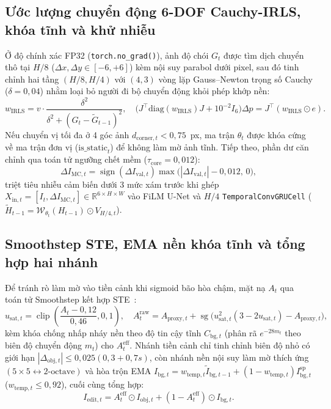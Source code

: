 \documentclass[journal]{IEEEtran}
\DeclareMathOperator{\clip}{clip}
\DeclareMathOperator{\sg}{sg}
\DeclareMathOperator{\sign}{sign}
\begin{document}
\subsection{Ước lượng chuyển động 6-DOF Cauchy-IRLS, khóa tĩnh và khử nhiễu}
Ở độ chính xác FP32 (\texttt{torch.no\_grad()}), ảnh độ chói $G_t$ được tìm dịch chuyển thô tại $H/8$ ($\Delta x, \Delta y \in [-6,+6]$) kèm nội suy parabol dưới pixel, sau đó tinh chỉnh hai tầng $(H/8, H/4)$ với $(4,3)$ vòng lặp Gauss--Newton trọng số Cauchy ($\delta = 0{,}04$) nhằm loại bỏ người đi bộ chuyển động khỏi phép khớp nền:
\begin{equation}
    w_{\mathrm{IRLS}} = v \cdot \frac{\delta^2}{\delta^2 + (G_t - \tilde{G}_{t-1})^2}, \quad \big(J^\top \mathrm{diag}(w_{\mathrm{IRLS}}) J + 10^{-2} I_6\big)\Delta p = J^\top (w_{\mathrm{IRLS}}\odot e).
    \label{eq:irls_solve}
\end{equation}
Nếu chuyển vị tối đa ở 4 góc ảnh $d_{\mathrm{corner},t} < 0{,}75$~px, ma trận $\theta_t$ được khóa cứng về ma trận đơn vị ($\mathrm{is\_static}_t$) để không làm mờ ảnh tĩnh. Tiếp theo, phần dư căn chỉnh qua toán tử ngưỡng chết mềm ($\tau_{\mathrm{core}} = 0{,}012$):
\begin{equation}
    \Delta I_{\mathrm{MC},t} = \sign(\Delta I_{\mathrm{val},t}) \max\!\big(|\Delta I_{\mathrm{val},t}| - 0{,}012,\, 0\big),
    \label{eq:deadzone_core}
\end{equation}
triệt tiêu nhiễu cảm biến dưới 3 mức xám trước khi ghép $X_{\mathrm{in},t} = [I_t, \Delta I_{\mathrm{MC},t}] \in \mathbb{R}^{6\times H\times W}$ vào FiLM U-Net và $H/4$ \texttt{TemporalConvGRUCell} ($\tilde{H}_{t-1} = \mathcal{W}_{\theta_t}(H_{t-1})\odot V_{H/4,t}$).

\subsection{Smoothstep STE, EMA nền khóa tĩnh và tổng hợp hai nhánh}
Để tránh rò làm mờ vào tiền cảnh khi sigmoid bão hòa chậm, mặt nạ $A_t$ qua toán tử Smoothstep kết hợp STE~\cite{bengio2013ste}:
\begin{equation}
    u_{\mathrm{sat},t} = \clip\!\left(\frac{A_t - 0{,}12}{0{,}46}, 0, 1\right), \quad A_t^{\mathrm{raw}} = A_{\mathrm{proxy},t} + \sg\big(u_{\mathrm{sat},t}^2(3 - 2u_{\mathrm{sat},t}) - A_{\mathrm{proxy},t}\big),
    \label{eq:smoothstep_ste}
\end{equation}
kèm khóa chống nhấp nháy nền theo độ tin cậy tĩnh $C_{\mathrm{bg},t}$ (phân rã $e^{-28 m_t}$ theo biên độ chuyển động $m_t$) cho $A_t^{\mathrm{eff}}$. Nhánh tiền cảnh chỉ tinh chỉnh biên độ nhỏ có giới hạn $|\Delta_{\mathrm{obj},t}| \le 0{,}025(0{,}3+0{,}7s)$, còn nhánh nền nội suy làm mờ thích ứng $(5\times 5 \leftrightarrow 2\text{-octave})$ và hòa trộn EMA $I_{\mathrm{bg},t} = w_{\mathrm{temp},t}\tilde{I}_{\mathrm{bg},t-1} + (1 - w_{\mathrm{temp},t})I_{\mathrm{bg},t}^{\mathrm{sp}}$ ($w_{\mathrm{temp},t} \le 0{,}92$), cuối cùng tổng hợp:
\begin{equation}
    I_{\mathrm{edit},t} = A_t^{\mathrm{eff}} \odot I_{\mathrm{obj},t} + (1 - A_t^{\mathrm{eff}}) \odot I_{\mathrm{bg},t}.
    \label{eq:pixel_blend}
\end{equation}
\end{document}
